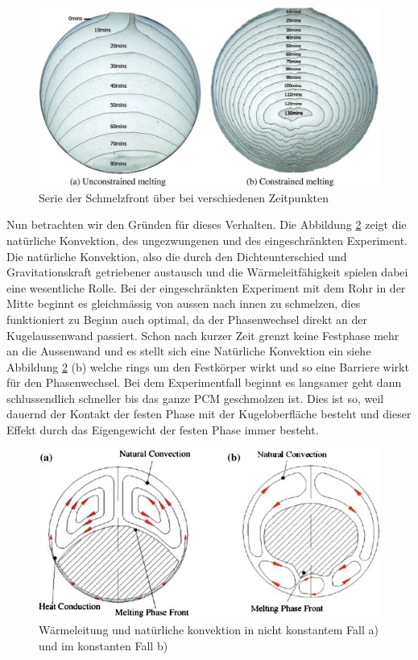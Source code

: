 \documentclass[11pt,a4paper]{scrartcl}
\begin{document}
\begin{figure}[h!]
\begin{center}
\includegraphics[scale=0.3]{images/meltingphasefront.jpg}
\caption{Serie der Schmelzfront über bei verschiedenen Zeitpunkten \cite{meltingpaper}}
\label{fig:meltingphasefront}
\end{center}
\end{figure}

Nun betrachten wir den Gründen für dieses Verhalten. Die Abbildung \ref{fig:heatconductionin} zeigt die natürliche Konvektion, des ungezwungenen und des eingeschränkten Experiment. Die natürliche Konvektion, also die durch den Dichteunterschied und Gravitationskraft getriebener austausch und die Wärmeleitfähigkeit spielen dabei eine wesentliche Rolle. Bei der eingeschränkten Experiment mit dem Rohr in der Mitte beginnt es gleichmässig von aussen nach innen zu schmelzen, dies funktioniert zu Beginn auch optimal, da der Phasenwechsel direkt an der Kugelaussenwand passiert. Schon nach kurzer Zeit grenzt keine Festphase mehr an die Aussenwand und es stellt sich eine Natürliche Konvektion ein siehe Abbildung \ref{fig:heatconductionin} (b) welche rings um den Festkörper wirkt und so eine Barriere wirkt für den Phasenwechsel. Bei dem Experimentfall beginnt es langsamer geht dann schlussendlich schneller bis das ganze PCM geschmolzen ist. Dies ist so, weil dauernd der Kontakt der festen Phase mit der Kugeloberfläche besteht und dieser Effekt durch das Eigengewicht der festen Phase immer besteht. 

\begin{figure}[h!]
\begin{center}
\includegraphics[scale=0.6]{images/heatconductionin.jpg}
\caption{Wärmeleitung und natürliche konvektion in nicht konstantem Fall a) und im konstanten Fall b) \cite{WasteEnergyHarvesting}}
\label{fig:heatconductionin}
\end{center}
\end{figure}
\end{document}
